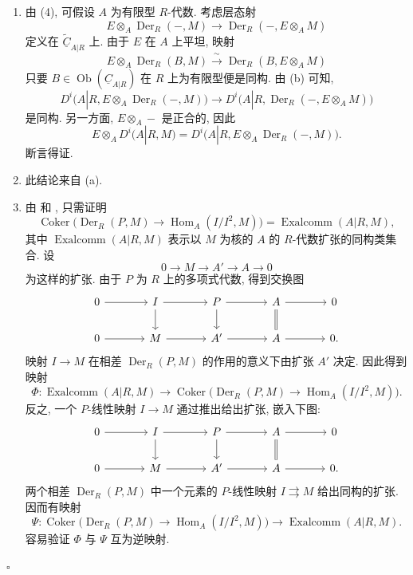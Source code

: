 \begin{enumerate}[label=(\arabic*)]
\item 由 (4), 可假设 $A$ 为有限型 $R$-代数. 考虑层态射
\[
 E\otimes_A\operatorname{Der}_R(-,M)
 \longrightarrow
 \operatorname{Der}_R(-,E\otimes_AM)
\]
定义在 $\widetilde{\underline C}_{A|R}$ 上. 由于 $E$ 在 $A$ 上平坦, 映射
\[
 E\otimes_A\operatorname{Der}_R(B,M)
 \xrightarrow{\ \sim\ }
 \operatorname{Der}_R(B,E\otimes_AM)
\]
只要 $B\in\operatorname{Ob}(\underline C_{A|R})$ 在 $R$ 上为有限型便是同构. 由 (b) 可知,
\[
 D^i\bigl(A|R,E\otimes_A\operatorname{Der}_R(-,M)\bigr)
 \longrightarrow
 D^i\bigl(A|R,\operatorname{Der}_R(-,E\otimes_AM)\bigr)
\]
是同构. 另一方面, $E\otimes_A-$ 是正合的, 因此
\[
 E\otimes_AD^i(A|R,M)
 =D^i\bigl(A|R,E\otimes_A\operatorname{Der}_R(-,M)\bigr).
\]
断言得证.

\item 此结论来自 (a).


\item 由  和 , 只需证明
\[
 \operatorname{Coker}\bigl(
 \operatorname{Der}_R(P,M)\longrightarrow
 \operatorname{Hom}_A(I/I^2,M)\bigr)
 =\operatorname{Exalcomm}(A|R,M),
\]
其中 $\operatorname{Exalcomm}(A|R,M)$ 表示以 $M$ 为核的 $A$ 的 $R$-代数扩张的同构类集合.
设
\[
 0\longrightarrow M\longrightarrow A'\longrightarrow A
 \longrightarrow0
\]
为这样的扩张. 由于 $P$ 为 $R$ 上的多项式代数, 得到交换图
\[
\begin{tikzcd}[column sep=large]
0 \arrow[r] & I \arrow[r] \arrow[d]
& P \arrow[r] \arrow[d]
& A \arrow[r] \arrow[d,equal] & 0 \\
0 \arrow[r] & M \arrow[r]
& A' \arrow[r]
& A \arrow[r] & 0.
\end{tikzcd}
\]
映射 $I\longrightarrow M$ 在相差 $\operatorname{Der}_R(P,M)$ 的作用的意义下由扩张 $A'$ 决定. 因此得到映射
\[
 \Phi:\operatorname{Exalcomm}(A|R,M)
 \longrightarrow
 \operatorname{Coker}\bigl(
 \operatorname{Der}_R(P,M)\longrightarrow
 \operatorname{Hom}_A(I/I^2,M)\bigr).
\]
反之, 一个 $P$-线性映射 $I\longrightarrow M$ 通过推出给出扩张, 嵌入下图:
\[
\begin{tikzcd}[column sep=large]
0 \arrow[r] & I \arrow[r] \arrow[d]
& P \arrow[r] \arrow[d]
& A \arrow[r] \arrow[d,equal] & 0 \\
0 \arrow[r] & M \arrow[r]
& A' \arrow[r]
& A \arrow[r] & 0.
\end{tikzcd}
\]
两个相差 $\operatorname{Der}_R(P,M)$ 中一个元素的 $P$-线性映射 $I\rightrightarrows M$ 给出同构的扩张. 因而有映射
\[
 \Psi:\operatorname{Coker}\bigl(
 \operatorname{Der}_R(P,M)\longrightarrow
 \operatorname{Hom}_A(I/I^2,M)\bigr)
 \longrightarrow\operatorname{Exalcomm}(A|R,M).
\]
容易验证 $\Phi$ 与 $\Psi$ 互为逆映射.
\end{enumerate}
\hfill$\square$

